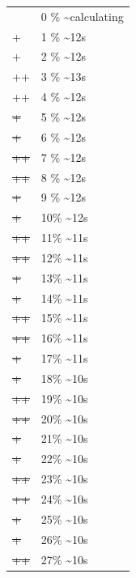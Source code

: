 \documentclass[12pt]{article}
\begin{document}
\begin{center}
\begin{tabular}{ll}
 & 0 \% \textasciitilde{}calculating\\
+ & 1 \% \textasciitilde{}12s\\
+ & 2 \% \textasciitilde{}12s\\
++ & 3 \% \textasciitilde{}13s\\
++ & 4 \% \textasciitilde{}12s\\
\sout{+} & 5 \% \textasciitilde{}12s\\
\sout{+} & 6 \% \textasciitilde{}12s\\
\sout{++} & 7 \% \textasciitilde{}12s\\
\sout{++} & 8 \% \textasciitilde{}12s\\
\sout{\sout{+}} & 9 \% \textasciitilde{}12s\\
\sout{\sout{+}} & 10\% \textasciitilde{}12s\\
\sout{\sout{++}} & 11\% \textasciitilde{}11s\\
\sout{\sout{++}} & 12\% \textasciitilde{}11s\\
\sout{\sout{\sout{+}}} & 13\% \textasciitilde{}11s\\
\sout{\sout{\sout{+}}} & 14\% \textasciitilde{}11s\\
\sout{\sout{\sout{++}}} & 15\% \textasciitilde{}11s\\
\sout{\sout{\sout{++}}} & 16\% \textasciitilde{}11s\\
\sout{\sout{\sout{\sout{+}}}} & 17\% \textasciitilde{}11s\\
\sout{\sout{\sout{\sout{+}}}} & 18\% \textasciitilde{}10s\\
\sout{\sout{\sout{\sout{++}}}} & 19\% \textasciitilde{}10s\\
\sout{\sout{\sout{\sout{++}}}} & 20\% \textasciitilde{}10s\\
\sout{\sout{\sout{\sout{\sout{+}}}}} & 21\% \textasciitilde{}10s\\
\sout{\sout{\sout{\sout{\sout{+}}}}} & 22\% \textasciitilde{}10s\\
\sout{\sout{\sout{\sout{\sout{++}}}}} & 23\% \textasciitilde{}10s\\
\sout{\sout{\sout{\sout{\sout{++}}}}} & 24\% \textasciitilde{}10s\\
\sout{\sout{\sout{\sout{\sout{\sout{+}}}}}} & 25\% \textasciitilde{}10s\\
\sout{\sout{\sout{\sout{\sout{\sout{+}}}}}} & 26\% \textasciitilde{}10s\\
\sout{\sout{\sout{\sout{\sout{\sout{++}}}}}} & 27\% \textasciitilde{}10s\\

\end{tabular}
\end{center}
\end{document}
